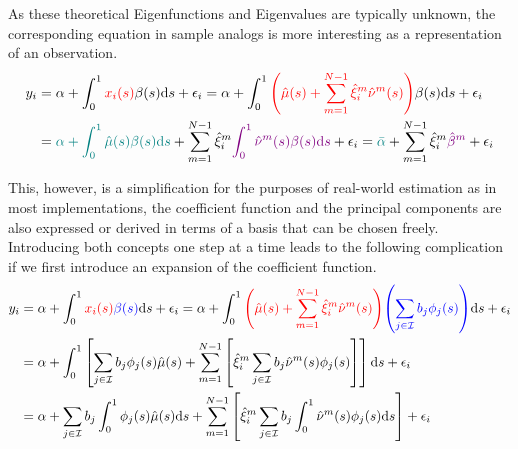 \documentclass[11pt,twoside,a4paper]{article}
\begin{document}
	As these theoretical Eigenfunctions and Eigenvalues are typically unknown, the corresponding equation in sample analogs is more interesting as a representation of an observation.
	\begin{equation}
		\begin{split}
			y_i &= \alpha + \int_{0}^{1} {\color{red}x_i(s)} \beta(s) \mathrm{d}s + \epsilon_i
			= \alpha + \int_{0}^{1} {\color{red}\left(\hat{\mu}(s) + \sum_{m = 1}^{N-1} \hat{\xi}^m_i \hat{\nu}^m(s)\right)} \beta(s) \mathrm{d}s + \epsilon_i\\
			&= {\color{teal}\alpha + \int_{0}^{1} \hat{\mu}(s) \beta(s) \mathrm{d}s} + \sum_{m = 1}^{N-1} \hat{\xi}^m_i {\color{violet}\int_{0}^{1} \hat{\nu}^m(s) \beta(s) \mathrm{d}s} + \epsilon_i
			= {\color{teal}\bar{\alpha}} + \sum_{m = 1}^{N-1} \hat{\xi}^m_i {\color{violet}\hat{\beta}^m} + \epsilon_i
		\end{split}
	\end{equation}
	
	This, however, is a simplification for the purposes of real-world estimation as in most implementations, the coefficient function and the principal components are also expressed or derived in terms of a basis that can be chosen freely. Introducing both concepts one step at a time leads to the following complication if we first introduce an expansion of the coefficient function.
	\begin{equation}
		\begin{split}
			y_i &= \alpha + \int_{0}^{1} {\color{red}x_i(s)} {\color{blue}\beta(s)} \mathrm{d}s + \epsilon_i
			= \alpha + \int_{0}^{1} {\color{red}\left(\hat{\mu}(s) + \sum_{m = 1}^{N-1} \hat{\xi}^{m}_i \hat{\nu}^{m}(s)\right)} {\color{blue}\left(\sum_{j \in \mathcal{I}} b_j \phi_j(s)\right)} \mathrm{d}s + \epsilon_i\\
			&= \alpha + \int_{0}^{1} \left[ \sum_{j \in \mathcal{I}} b_j \phi_j(s) \hat{\mu}(s) + \sum_{m = 1}^{N-1} \left[ \hat{\xi}^m_i \sum_{j \in \mathcal{I}} b_j \hat{\nu}^m(s) \phi_j(s) \right] \right] \mathrm{d}s + \epsilon_i \\
			&= \alpha + \sum_{j \in \mathcal{I}} b_j \int_{0}^{1} \phi_j(s) \hat{\mu}(s) \mathrm{d}s + \sum_{m = 1}^{N-1} \left[ \hat{\xi}^m_i \sum_{j \in \mathcal{I}} b_j \int_{0}^{1}\hat{\nu}^m(s) \phi_j(s) \mathrm{d}s \right] + \epsilon_i
		\end{split}
	\end{equation}
\end{document}
